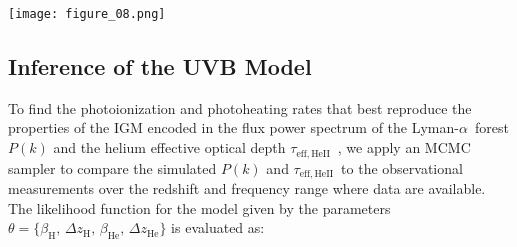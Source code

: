 \documentclass[twocolumn]{aastex62}
\newcommand\Lya{Lyman-$\alpha$}
\def\HeII{\hbox{He~$\scriptstyle\rm II$}}
\newcommand\taueffHe{$\tau_{\mathrm{eff,HeII}}$~}
\begin{document}
  

\begin{figure*}
\texttt{[image: figure\_08.png]}
\caption{Results from the Bayesian inference procedure, showing one- and two-dimensional projections of the posterior distributions
for the parameters $\theta= \{ \beta_{\mathrm{H}}, \,\Delta z_{\mathrm{H}}, \, \beta_{\mathrm{He}}, \,\Delta z_{\mathrm{He}}\}$.
The parameter constraints were obtained by 
fitting the observed flux power spectrum of the \Lya\ forest and the \HeII\ effective optical depth \citep{Chabanier+2019, boera2019a,  Worseck+2019, Irsic+2017a} with a grid of CHIPS simulations. 
The posterior distribution shows a clear global maximum, and while other local maxima are present their peak likelihoods 
are significantly lower than the global maximum.    
The resulting best-fit parameters and their 95\% confidence intervals are shown in the top right corner.}    
\label{fig:corner}
\end{figure*}

\subsection{Inference of the UVB Model}\label{sec:uvb_inference}

To find the photoionization and photoheating rates that best reproduce the properties of the IGM encoded in the 
flux power spectrum of the \Lya\ forest $P(k)$ and the helium effective optical depth \taueffHe, we apply an MCMC
sampler to compare the simulated $P(k)$ and \taueffHe to the observational measurements over the redshift  
and frequency range where data are available. The likelihood function for the model given by the parameters  
$\theta= \{ \beta_{\mathrm{H}}, \,\Delta z_{\mathrm{H}}, \, \beta_{\mathrm{He}}, \,\Delta z_{\mathrm{He}} \} $  is evaluated as:
\end{document}

